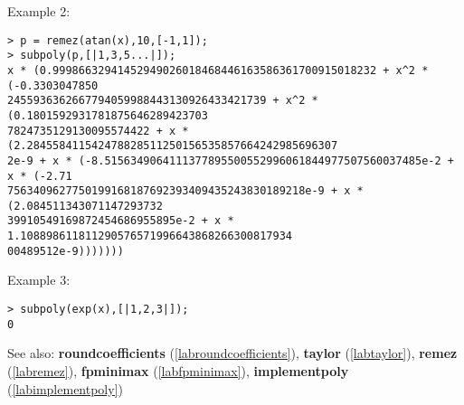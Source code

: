 \noindent Example 2: 
\begin{center}\begin{minipage}{15cm}\begin{Verbatim}[frame=single,commandchars=\\\|\~]
> p = remez(atan(x),10,[-1,1]);
> subpoly(p,[|1,3,5...|]);
x * (0.99986632941452949026018468446163586361700915018232 + x^2 * (-0.3303047850
2455936362667794059988443130926433421739 + x^2 * (0.1801592931781875646289423703
7824735129130095574422 + x * (2.284558411542478828511250156535857664242985696307
2e-9 + x * (-8.5156349064111377895500552996061844977507560037485e-2 + x * (-2.71
7563409627750199168187692393409435243830189218e-9 + x * (2.084511343071147293732
39910549169872454686955895e-2 + x * 1.108898611811290576571996643868266300817934
00489512e-9)))))))
\end{Verbatim}
\end{minipage}\end{center}
\noindent Example 3: 
\begin{center}\begin{minipage}{15cm}\begin{Verbatim}[frame=single,commandchars=\\\|\~]
> subpoly(exp(x),[|1,2,3|]);
0
\end{Verbatim}
\end{minipage}\end{center}
See also: \textbf{roundcoefficients} (\ref{labroundcoefficients}), \textbf{taylor} (\ref{labtaylor}), \textbf{remez} (\ref{labremez}), \textbf{fpminimax} (\ref{labfpminimax}), \textbf{implementpoly} (\ref{labimplementpoly})
